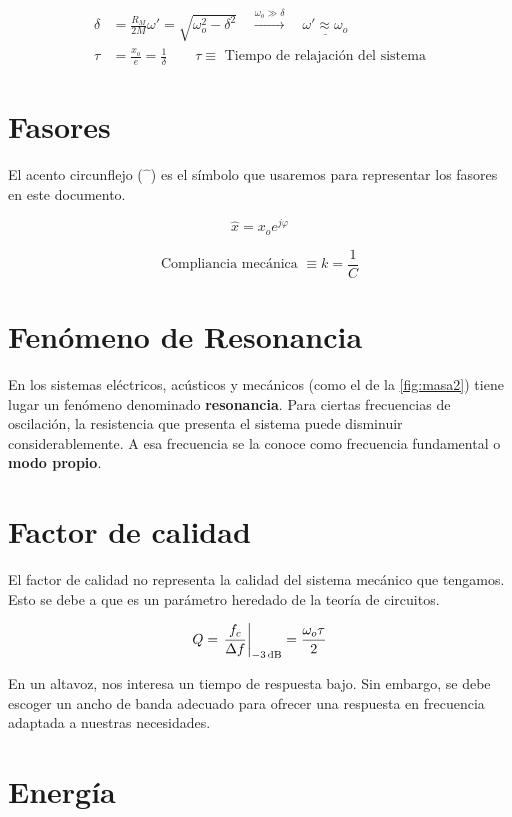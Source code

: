 \documentclass[a4paper]{book}
\begin{document}
\begin{align*}
	\delta & = \frac{R_M}{2M}
	\omega ' = \sqrt{\omega _o^2 - \delta ^2} \quad \xrightarrow{\omega _o \gg \delta} \quad \underline{\omega ' \approx \omega_o} \\[5pt]
	\tau   & = \frac{x_o}{e} = \frac{1}{\delta} \qquad \tau \equiv \textrm{ Tiempo de relajación del sistema}
\end{align*}

\section{Fasores}

El acento circunflejo ($\hat{\phantom{x}}$) es el símbolo que usaremos para representar los fasores en este documento.

\[ \hat{x} = x_o e^{j\varphi} \]

\[ \textrm{Compliancia mecánica }\equiv k = \frac{1}{C} \]

\section{Fenómeno de Resonancia}

En los sistemas eléctricos, acústicos y mecánicos (como el de la \autoref{fig:masa2}) tiene lugar un fenómeno denominado \textbf{resonancia}. Para ciertas frecuencias de oscilación, la resistencia que presenta el sistema puede disminuir considerablemente. A esa frecuencia se la conoce como frecuencia fundamental o \textbf{modo propio}.



\section{Factor de calidad}

El factor de calidad no representa la calidad del sistema mecánico que tengamos. Esto se debe a que es un parámetro heredado de la teoría de circuitos.

\[ Q = \left. \frac{f_c}{\Delta f } \right\rvert _{-3\operatorname{dB}} = \frac{\omega_o \tau}{2}\]

En un altavoz, nos interesa un tiempo de respuesta bajo. Sin embargo, se debe escoger un ancho de banda adecuado para ofrecer una respuesta en frecuencia adaptada a nuestras necesidades.

\section{Energía}
\end{document}
